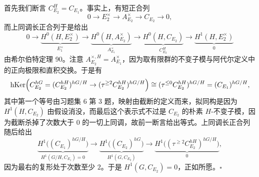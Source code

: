 首先我们断言 $C_{E_2}^H=C_{E_1}$。事实上，有短正合列
\[
0\to E_2^\times\to A_{E_2}^\times\to C_{E_2}\to 0,
\]
而上同调长正合列于是给出
\[
0\to\underbrace{H^0(H,E_2^\times)}_{E_1^\times}\to\underbrace{H^0(H,A_{E_2}^\times)}_{A_{E_1}^\times}\to\underbrace{H^0(H,C_{E_2})}_{C_{E_2}^H}\to\underbrace{H^1(H,E_2^\times)}_{0}
\]
由希尔伯特定理 90。注意 $A_{E_2}^{\times,H}=A_{E_1}^\times$，因为取有限群的不变子模与阿代尔定义中的正向极限和直积交换。于是有
\[
\operatorname{hKer}\Bigl(C_{E_2}^{hG}=(C_{E_2}^{hH})^{hG/H}\to(\tau^{\ge2}C_{E_2}^{hH})^{hG/H}\Bigr)\cong(\tau^{\le0}C_{E_2}^{hH})^{hG/H}=(C_{E_1})^{hG/H},
\]
其中第一个等号由习题集 6 第 3 题，映射由截断的定义而来，拟同构是因为 $H^1(H,C_{E_2})$ 由假设消没，而最后这个表示式不过是 $C_{E_2}$ 的朴素 $H$-不变子模，因为截断杀掉了次数大于 $0$ 的一切上同调，故前一断言给出等式。上同调长正合列随后给出
\[
\underbrace{H^1\bigl((C_{E_1})^{hG/H}\bigr)}_{H^1(G/H,C_{E_1})=0}\to\underbrace{H^1\bigl((C_{E_2})^{hG}\bigr)}_{H^1(G,C_{E_2})}\to\underbrace{H^1\bigl((\tau^{\ge2}C_{E_2}^{hH})^{hG/H}\bigr)}_{0},
\]
因为最右的复形处于次数至少 $2$。于是 $H^1(G,C_{E_2})=0$，正如所愿。\hfill$\square$
